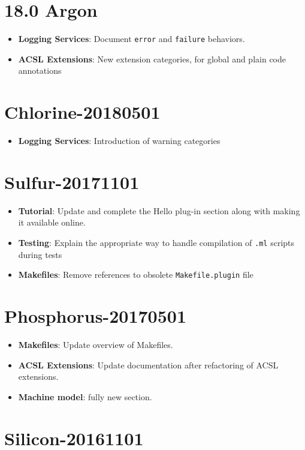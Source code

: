 \section*{18.0 Argon}
\begin{itemize}
\item \textbf{Logging Services}: Document \texttt{error} and \texttt{failure} behaviors.
\item \textbf{ACSL Extensions}: New extension categories, for global and plain code annotations
\end{itemize}

\section*{Chlorine-20180501}

\begin{itemize}
\item \textbf{Logging Services}: Introduction of warning categories
\end{itemize}

\section*{Sulfur-20171101}
\begin{itemize}
\item \textbf{Tutorial}: Update and complete the Hello plug-in section
along with making it available online.
\item \textbf{Testing}: Explain the appropriate way to handle compilation
of \texttt{.ml} scripts during tests
\item \textbf{Makefiles}: Remove references to obsolete
\texttt{Makefile.plugin} file
\end{itemize}

\section*{Phosphorus-20170501}

\begin{itemize}
\item \textbf{Makefiles}: Update overview of Makefiles.
\item\textbf{ACSL Extensions}: Update documentation after refactoring of
ACSL extensions.
\item\textbf{Machine model}: fully new section.
\end{itemize}

\section*{Silicon-20161101}

